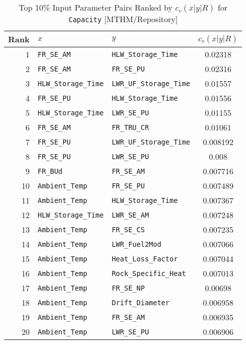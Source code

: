 \begin{center}
\begin{table}[htbp]
\caption{Top 10\% Input Parameter Pairs Ranked by $c_v(x|y|R)$ for \texttt{Capacity} [MTHM/Repository]}
\label{cv_x_y_R_for_Capacity_with_IJK7}
\begin{center}
\scriptsize
\begin{tabular}{|r|l|l|c|}
\hline
Rank&\textbf{$x$}&\textbf{$y$}&\textbf{$c_v(x|y|R)$}\\
\hline
1&\texttt{FR\_SE\_AM}&\texttt{HLW\_Storage\_Time}&0.02318\\
\hline
2&\texttt{FR\_SE\_AM}&\texttt{FR\_SE\_PU}&0.02316\\
\hline
3&\texttt{HLW\_Storage\_Time}&\texttt{LWR\_UF\_Storage\_Time}&0.01557\\
\hline
4&\texttt{FR\_SE\_PU}&\texttt{HLW\_Storage\_Time}&0.01556\\
\hline
5&\texttt{HLW\_Storage\_Time}&\texttt{LWR\_SE\_PU}&0.01155\\
\hline
6&\texttt{FR\_SE\_AM}&\texttt{FR\_TRU\_CR}&0.01061\\
\hline
7&\texttt{FR\_SE\_PU}&\texttt{LWR\_UF\_Storage\_Time}&0.008192\\
\hline
8&\texttt{FR\_SE\_PU}&\texttt{LWR\_SE\_PU}&0.008\\
\hline
9&\texttt{FR\_BUd}&\texttt{FR\_SE\_AM}&0.007716\\
\hline
10&\texttt{Ambient\_Temp}&\texttt{FR\_SE\_PU}&0.007489\\
\hline
11&\texttt{Ambient\_Temp}&\texttt{HLW\_Storage\_Time}&0.007367\\
\hline
12&\texttt{HLW\_Storage\_Time}&\texttt{LWR\_SE\_AM}&0.007248\\
\hline
13&\texttt{Ambient\_Temp}&\texttt{FR\_SE\_CS}&0.007235\\
\hline
14&\texttt{Ambient\_Temp}&\texttt{LWR\_Fuel2Mod}&0.007066\\
\hline
15&\texttt{Ambient\_Temp}&\texttt{Heat\_Loss\_Factor}&0.007044\\
\hline
16&\texttt{Ambient\_Temp}&\texttt{Rock\_Specific\_Heat}&0.007013\\
\hline
17&\texttt{Ambient\_Temp}&\texttt{FR\_SE\_NP}&0.00698\\
\hline
18&\texttt{Ambient\_Temp}&\texttt{Drift\_Diameter}&0.006958\\
\hline
19&\texttt{Ambient\_Temp}&\texttt{FR\_SE\_AM}&0.006935\\
\hline
20&\texttt{Ambient\_Temp}&\texttt{LWR\_SE\_PU}&0.006906\\

\end{tabular}
\end{center}
\end{table}
\end{center}
